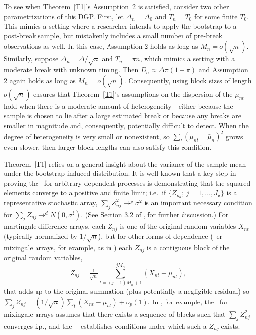 \documentclass[11pt]{article}
\begin{document}
To see when Theorem~\ref{T1}'s Assumption~2 is satisfied, consider two
other parametrizations of this DGP\@. First, let $\Delta_n = \Delta_0$
and $T_n = T_0$ for some finite $T_0$. This mimics a setting where a
researcher intends to apply the bootstrap to a post-break sample, but
mistakenly includes a small number of pre-break observations as
well. In this case, Assumption 2 holds as long as
$M_n = o(\sqrt{n})$.  Similarly, suppose
$\Delta_n = \Delta / \sqrt{n}$ and $T_n = \pi n$, which mimics a
setting with a moderate break with unknown timing.  Then
$D_n \approx \Delta \pi (1 - \pi)$ and Assumption 2 again holds as long as
$M_n = o(\sqrt{n})$. Consequently, using block sizes of length
$o(\sqrt{n})$ ensures that Theorem~\ref{T1}'s assumptions on the dispersion
of the $\mu_{nt}$ hold when there is a moderate amount of
heterogeneity---either because the sample is chosen to lie after a
large estimated break or because any breaks are smaller in
magnitude and, consequently, potentially difficult to detect. When the
degree of heterogeneity is very small or nonexistent, so
$\sum_t (\mu_{nt} - \bar \mu_n)^2$ grows even slower, then larger
block lengths can also satisfy this condition.

Theorem~\ref{T1} relies on a general insight about the
variance of the sample mean under the bootstrap-induced
distribution. It is well-known that a key step in proving the \clt\
for arbitrary dependent processes is demonstrating that the squared
elements converge to a positive and finite limit; i.e.\ if
$\{Z_{nj};~j=1,\dots,J_n\}$ is a representative stochastic array,
$\sum_j Z_{nj}^2 \to^p \sigma^2$ is an important necessary condition
for $\sum_j Z_{nj} \to^d N(0,\sigma^2)$.  (See Section 3.2 of
\citealp{HaH:80}, for further discussion.)  For martingale difference
arrays, each $Z_{nj}$ is one of the original random variables $X_{nt}$
(typically normalized by $1/\sqrt{n}$), but for other forms of
dependence (\ned\ or mixingale arrays, for example, as in
\citealp{Jon:97}) each $Z_{nj}$ is a contiguous block of the original
random variables,
\begin{equation*}
  Z_{nj} = \tfrac{1}{\sqrt{n}} \sum_{t=(j-1) M_n +1}^{j M_n} (X_{nt} - \mu_{nt}),
\end{equation*}
that adds up to the original summation (plus potentially a negligible
residual) so $\sum_j Z_{nj}= (1/\sqrt{n}) \sum_t (X_{nt} - \mu_{nt}) +
o_p(1)$. In \citet{Jon:97}, for example, the \clt\ for mixingale
arrays assumes that there exists a sequence of blocks such that $\sum_j
Z_{nj}^2$ converges i.p., and the \ned\ \clt\ establishes conditions
under which such a $Z_{nj}$ exists.
\end{document}
